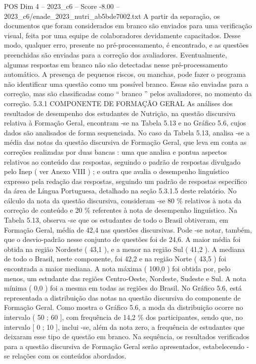 \begin{textsample}{POS Dim 4 – 2023\_c6 – Score -8.00 – 2023\_c6/enade\_2023\_nutri\_ab5bde7002.txt}
A partir da separação, os documentos que foram considerados em branco são enviados para uma verificação visual, feita por uma equipe de colaboradores devidamente capacitados.
Desse modo, qualquer erro, presente no pré-processamento, é encontrado, e as questões preenchidas são enviadas para a correção dos avaliadores.
Eventualmente, algumas respostas em branco não são detectadas nesse pré-processamento automático.
A presença de pequenos riscos, ou manchas, pode fazer o programa não identificar uma questão como um possível branco.
Essas são enviadas para a correção, mas são classificadas como “ branco ” pelos avaliadores, no momento da correção. 5.3.1 COMPONENTE DE FORMAÇÃO GERAL As análises dos resultados de desempenho dos estudantes de Nutrição, na questão discursiva relativa à Formação Geral, encontram -se na Tabela 5.13 e no Gráfico 5.6, cujos dados são analisados de forma sequenciada.
No caso da Tabela 5.13, analisa -se a média das notas da questão discursiva de Formação Geral, que leva em conta as correções realizadas por duas bancas : uma que analisa e pontua aspectos relativos ao conteúdo das respostas, seguindo o padrão de respostas divulgado pelo Inep ( ver Anexo VIII ) ; e outra que avalia o desempenho linguístico expresso pela redação das respostas, seguindo um padrão de respostas específico da área de Língua Portuguesa, detalhado na seção 5.3.1.5 deste relatório.
No cálculo da nota da questão discursiva, consideram -se 80 \% relativos à nota da correção de conteúdo e 20 \% referentes à nota de desempenho linguístico.
Na Tabela 5.13, observa -se que os estudantes de todo o Brasil obtiveram, em Formação Geral, média de 42,4 nas questões discursivas.
Pode -se notar, também, que o desvio-padrão nesse conjunto de questões foi de 24,6.
A maior média foi obtida na região Nordeste ( 43,1 ), e a menor na região Sul ( 41,2 ).
A mediana de todo o Brasil, neste componente, foi 42,2 e na região Norte ( 43,5 ) foi encontrada a maior mediana.
A nota máxima ( 100,0 ) foi obtida por, pelo menos, um estudante das regiões Centro-Oeste, Nordeste, Sudeste e Sul.
A nota mínima ( 0,0 ) foi a mesma em todas as regiões do Brasil.
No Gráfico 5.6, está representada a distribuição das notas na questão discursiva do componente de Formação Geral.
Como mostra o Gráfico 5.6, a moda da distribuição ocorre no intervalo ( 50 ; 60 ], com frequência de 14,2 \% dos participantes, sendo que, no intervalo [ 0 ; 10 ], inclui -se, além da nota zero, a frequência de estudantes que deixaram esse tipo de questão em branco.
Na sequência, os resultados verificados para a questão discursiva de Formação Geral serão apresentados, estabelecendo -se relações com os conteúdos abordados.

\end{textsample}
